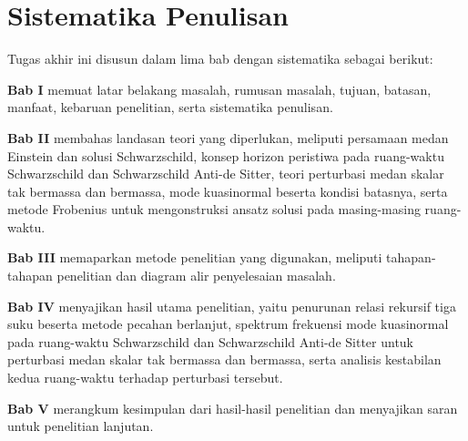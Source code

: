 \section{Sistematika Penulisan}
\label{sec:sistematika-penulisan}

Tugas akhir ini disusun dalam lima bab dengan sistematika sebagai berikut:

\noindent\textbf{Bab I} memuat latar belakang masalah, rumusan masalah, tujuan, batasan, manfaat, kebaruan penelitian, serta sistematika penulisan.

\noindent\textbf{Bab II} membahas landasan teori yang diperlukan, meliputi persamaan medan Einstein dan solusi Schwarzschild, konsep horizon peristiwa pada ruang-waktu Schwarzschild dan Schwarzschild Anti-de Sitter, teori perturbasi medan skalar tak bermassa dan bermassa, mode kuasinormal beserta kondisi batasnya, serta metode Frobenius untuk mengonstruksi ansatz solusi pada masing-masing ruang-waktu.

\noindent\textbf{Bab III} memaparkan metode penelitian yang digunakan, meliputi tahapan-tahapan penelitian dan diagram alir penyelesaian masalah.

\noindent\textbf{Bab IV} menyajikan hasil utama penelitian, yaitu penurunan relasi rekursif tiga suku beserta metode pecahan berlanjut, spektrum frekuensi mode kuasinormal pada ruang-waktu Schwarzschild dan Schwarzschild Anti-de Sitter untuk perturbasi medan skalar tak bermassa dan bermassa, serta analisis kestabilan kedua ruang-waktu terhadap perturbasi tersebut.

\noindent\textbf{Bab V} merangkum kesimpulan dari hasil-hasil penelitian dan menyajikan saran untuk penelitian lanjutan.